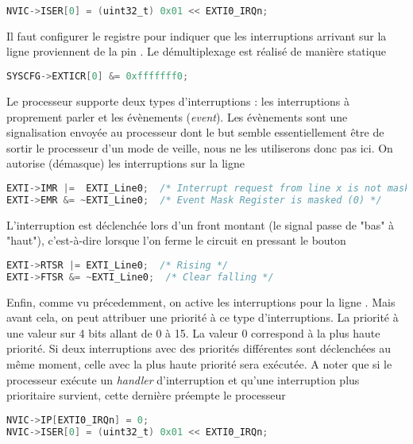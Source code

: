 \documentclass{FicheLecture}
\begin{document}
\begin{lstlisting}[language=C]
NVIC->ISER[0] = (uint32_t) 0x01 << EXTI0_IRQn;
\end{lstlisting}

Il faut configurer le registre  pour indiquer que les interruptions arrivant sur la ligne  proviennent de la pin . Le démultiplexage est réalisé de manière statique

\begin{lstlisting}[language=C]
SYSCFG->EXTICR[0] &= 0xfffffff0;
\end{lstlisting}

Le processeur supporte deux types d'interruptions : les interruptions à proprement parler et les évènements (\emph{event}). Les évènements sont une signalisation envoyée au processeur dont le but semble essentiellement être de sortir le processeur d'un mode de veille, nous ne les utiliserons donc pas ici. On autorise (démasque) les interruptions sur la ligne 

\begin{lstlisting}[language=C]
EXTI->IMR |=  EXTI_Line0;  /* Interrupt request from line x is not masked (1) */
EXTI->EMR &= ~EXTI_Line0;  /* Event Mask Register is masked (0) */
\end{lstlisting}

L'interruption est déclenchée lors d'un front montant (le signal passe de "bas" à "haut"), c'est-à-dire lorsque l'on ferme le circuit en pressant le bouton 

\begin{lstlisting}[language=C]
EXTI->RTSR |= EXTI_Line0;  /* Rising */
EXTI->FTSR &= ~EXTI_Line0;  /* Clear falling */
\end{lstlisting}

Enfin, comme vu précedemment, on active les interruptions pour la ligne . Mais avant cela, on peut attribuer une priorité à ce type d'interruptions. La priorité à une valeur sur 4 bits allant de 0 à 15. La valeur 0 correspond à la plus haute priorité. Si deux interruptions avec des priorités différentes sont déclenchées au même moment, celle avec la plus haute priorité sera exécutée. A noter que si le processeur exécute un \emph{handler} d'interruption et qu'une interruption plus prioritaire survient, cette dernière préempte le processeur

\begin{lstlisting}[language=C]
NVIC->IP[EXTI0_IRQn] = 0;
NVIC->ISER[0] = (uint32_t) 0x01 << EXTI0_IRQn;
\end{lstlisting}
\end{document}
